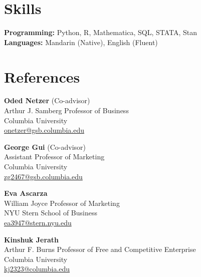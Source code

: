 \documentclass[12pt, letterpaper]{article}
\newenvironment{cvblock}{%
  \begin{list}{}{%
    \setlength{\leftmargin}{0.35in}%
    \setlength{\rightmargin}{0pt}%
    \setlength{\topsep}{2pt}%
    \setlength{\parsep}{0pt}%
    \setlength{\itemsep}{0pt}%
    \setlength{\partopsep}{0pt}%
  }%
  \item[]%
}{%
  \end{list}%
}
\begin{document}
\section{Skills}
\begin{cvblock}
\textbf{Programming:} Python, R, Mathematica, SQL, STATA, Stan\\[4pt]
\textbf{Languages:} Mandarin (Native), English (Fluent)
\end{cvblock}

\newpage
\section{References}
\begin{cvblock}
\begin{minipage}[t]{0.46\textwidth}
\textbf{Oded Netzer} (Co-advisor)\\
Arthur J. Samberg Professor of Business\\
Columbia University\\
\href{mailto:onetzer@gsb.columbia.edu}{onetzer@gsb.columbia.edu}
\end{minipage}%
\hfill
\begin{minipage}[t]{0.46\textwidth}
\textbf{George Gui} (Co-advisor)\\
Assistant Professor of Marketing\\
Columbia University\\
\href{mailto:zg2467@gsb.columbia.edu}{zg2467@gsb.columbia.edu}
\end{minipage}

\vspace{1em}

\begin{minipage}[t]{0.46\textwidth}
\textbf{Eva Ascarza}\\
William Joyce Professor of Marketing\\
NYU Stern School of Business\\
\href{mailto:ea3947@stern.nyu.edu}{ea3947@stern.nyu.edu}
\end{minipage}%
\hfill
\begin{minipage}[t]{0.46\textwidth}
\textbf{Kinshuk Jerath}\\
Arthur F. Burns Professor of Free and Competitive Enterprise\\
Columbia University\\
\href{mailto:kj2323@columbia.edu}{kj2323@columbia.edu}
\end{minipage}
\end{cvblock}
\end{document}
